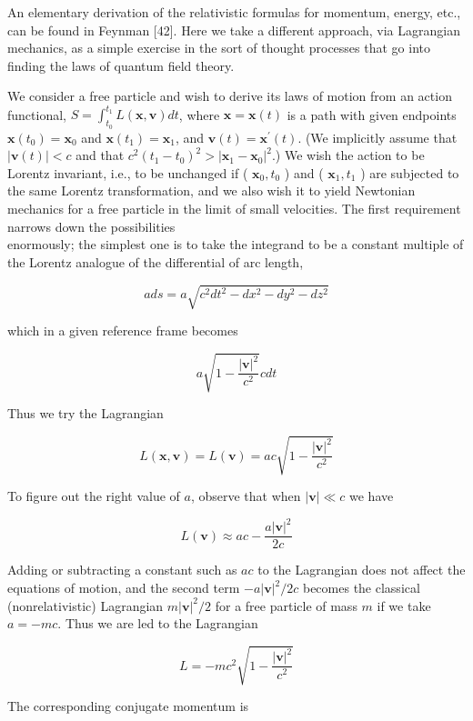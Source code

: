 \documentclass[10pt, letterpaper]{article}
\begin{document}
An elementary derivation of the relativistic formulas for momentum, energy, etc., can be found in Feynman [42]. Here we take a different approach, via Lagrangian mechanics, as a simple exercise in the sort of thought processes that go into finding the laws of quantum field theory.

We consider a free particle and wish to derive its laws of motion from an action functional, $S=\int_{t_{0}}^{t_{1}} L(\mathbf{x}, \mathbf{v}) d t$, where $\mathbf{x}=\mathbf{x}(t)$ is a path with given endpoints $\mathbf{x}\left(t_{0}\right)=\mathbf{x}_{0}$ and $\mathbf{x}\left(t_{1}\right)=\mathbf{x}_{1}$, and $\mathbf{v}(t)=\mathbf{x}^{\prime}(t)$. (We implicitly assume that $|\mathbf{v}(t)|<c$ and that $c^{2}\left(t_{1}-t_{0}\right)^{2}>\left|\mathbf{x}_{1}-\mathbf{x}_{0}\right|^{2}$.) We wish the action to be Lorentz invariant, i.e., to be unchanged if ( $\mathbf{x}_{0}, t_{0}$ ) and ( $\mathbf{x}_{1}, t_{1}$ ) are subjected to the same Lorentz transformation, and we also wish it to yield Newtonian mechanics for a free particle in the limit of small velocities. The first requirement narrows down the possibilities\\
enormously; the simplest one is to take the integrand to be a constant multiple of the Lorentz analogue of the differential of arc length,

$$
a d s=a \sqrt{c^{2} d t^{2}-d x^{2}-d y^{2}-d z^{2}}
$$

which in a given reference frame becomes

$$
a \sqrt{1-\frac{|\mathbf{v}|^{2}}{c^{2}}} c d t
$$

Thus we try the Lagrangian

$$
L(\mathbf{x}, \mathbf{v})=L(\mathbf{v})=a c \sqrt{1-\frac{|\mathbf{v}|^{2}}{c^{2}}}
$$

To figure out the right value of $a$, observe that when $|\mathbf{v}| \ll c$ we have

$$
L(\mathbf{v}) \approx a c-\frac{a|\mathbf{v}|^{2}}{2 c}
$$

Adding or subtracting a constant such as $a c$ to the Lagrangian does not affect the equations of motion, and the second term $-a|\mathbf{v}|^{2} / 2 c$ becomes the classical (nonrelativistic) Lagrangian $m|\mathbf{v}|^{2} / 2$ for a free particle of mass $m$ if we take $a= -m c$. Thus we are led to the Lagrangian

$$
L=-m c^{2} \sqrt{1-\frac{|\mathbf{v}|^{2}}{c^{2}}}
$$

The corresponding conjugate momentum is
\end{document}
